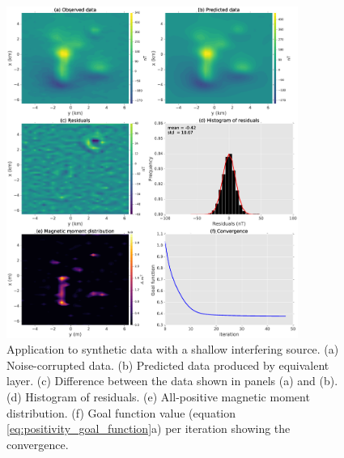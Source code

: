 \begin{figure}
	\centering
	\includegraphics[width=0.85\textwidth]{Fig/unidir_shallow_test/results_compiled_LM_NNLS_magRM.eps}
	\caption{Application to synthetic data with a shallow interfering source. (a) Noise-corrupted data. (b) Predicted data produced by equivalent layer. (c) Difference between the data shown in panels (a) and (b). (d) Histogram of residuals. (e) All-positive magnetic moment distribution. (f) Goal function value (equation \ref{eq:positivity_goal_function}a) per iteration showing the convergence.}
	\label{fig:unidir_shallow_test}
\end{figure}

